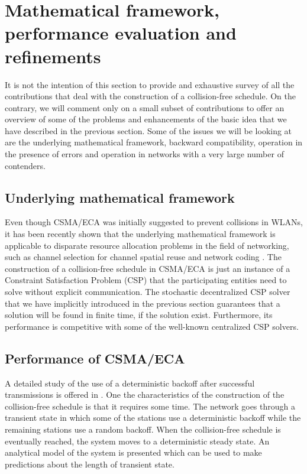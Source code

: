 \documentclass[journal]{IEEEtran}
\begin{document}
\section{Mathematical framework, performance evaluation and refinements}
\label{sec:survey}
It is not the intention of this section to provide and exhaustive survey of all the contributions that deal with the construction of a collision-free schedule.
On the contrary, we will comment only on a small subset of contributions to offer an overview of some of the problems and enhancements of the basic idea that we have described in the previous section. 
Some of the issues we will be looking at are the underlying mathematical framework, backward compatibility, operation in the presence of errors and operation in networks with a very large number of contenders. 

\subsection{Underlying mathematical framework}
Even though CSMA/ECA was initially suggested to prevent collisions in WLANs, it has been recently shown that the underlying mathematical framework is applicable to disparate resource allocation problems in the field of networking, such as channel selection for channel spatial reuse and network coding \cite{duffy2011dcs}.
The construction of a collision-free schedule in CSMA/ECA is just an instance of a Constraint Satisfaction Problem (CSP) that the participating entities need to solve without explicit communication.
The stochastic decentralized CSP solver that we have implicitly introduced in the previous section guarantees that a solution will be found in finite time, if the solution exist.
Furthermore, its performance is competitive with some of the well-known centralized CSP solvers.

\subsection{Performance of CSMA/ECA}

A detailed study of the use of a deterministic backoff after successful transmissions is offered in \cite{he2009srb}. 
One the characteristics of the construction of the collision-free schedule is that it requires some time.
The network goes through a transient state in which some of the stations use a deterministic backoff while the remaining stations use a random backoff.
When the collision-free schedule is eventually reached, the system moves to a deterministic steady state.
An analytical model of the system is presented which can be used to make predictions about the length of transient state.
\end{document}
